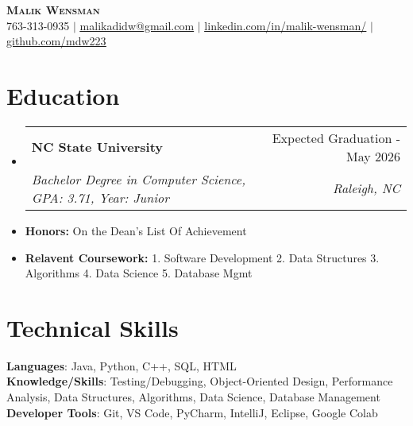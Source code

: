 \documentclass[letterpaper,11pt]{article}
\makeatletter
\newcommand{\resumeItem}[1]{
  \item\small{
    {#1 \vspace{-2pt}}
  }
}
\newcommand{\resumeSubheading}[4]{
  \vspace{-2pt}\item
    \begin{tabular*}{0.97\textwidth}[t]{l@{\extracolsep{\fill}}r}
      \textbf{#1} & #2 \\
      \textit{\small#3} & \textit{\small #4} \\
    \end{tabular*}\vspace{-7pt}
}
\newcommand{\resumeSubHeadingListStart}{\begin{itemize}[leftmargin=0.15in, label={}]}
\newcommand{\resumeSubHeadingListEnd}{\end{itemize}}
\makeatother
\begin{document}

\begin{center}
    \textbf{\Huge \scshape Malik Wensman} \\ \vspace{1pt}
    \small 763-313-0935 $|$ \href{mailto:malikadidw@gmail.com}{\underline{malikadidw@gmail.com}} $|$ 
    \href{https://www.linkedin.com/in/malik-wensman/}{\underline{linkedin.com/in/malik-wensman/}} $|$
    \href{https://github.com/mdw223}{\underline{github.com/mdw223}}
\end{center}


\section{Education}
  \resumeSubHeadingListStart
    \resumeSubheading
      {NC State University}{Expected Graduation - May 2026}
      {Bachelor Degree in Computer Science, GPA: 3.71, Year: Junior}{Raleigh, NC}
      \resumeItem{\textbf{Honors:} On the Dean's List Of Achievement}
      \resumeItem{\textbf{Relavent Coursework:} 1. Software Development 2. Data Structures 3. Algorithms 4. Data Science 5. Database Mgmt}
  \resumeSubHeadingListEnd

\section{Technical Skills}
 \begin{itemize}[leftmargin=0.15in, label={}]
    \small{\item{
     \textbf{Languages}{: Java, Python, C++, SQL, HTML} \\
     \textbf{Knowledge/Skills}{: Testing/Debugging, Object-Oriented Design, Performance Analysis, Data Structures, Algorithms, Data Science, Database Management} \\
     \textbf{Developer Tools}{: Git, VS Code, PyCharm, IntelliJ, Eclipse, Google Colab} \\
    }}
 \end{itemize}
 
\end{document}
